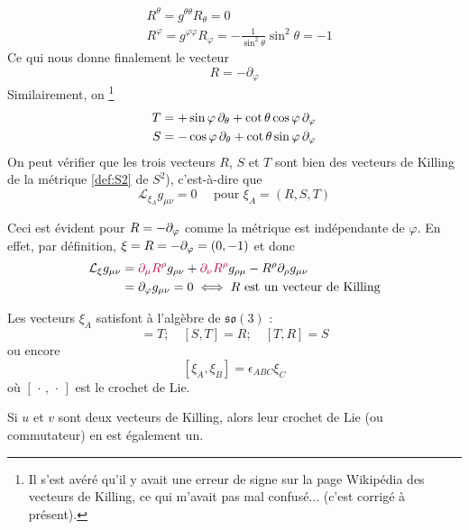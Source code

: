 \begin{align}
    &R^{\theta} = g^{\theta \theta}R_{\theta} = 0\\
    &R^{\varphi} = g^{\varphi \varphi}R_{\varphi} = -\frac{1}{\sin^2{\theta}}\sin^2{\theta} = -1
\end{align}
Ce qui nous donne finalement le vecteur
\begin{equation}
    R = -\partial_{\varphi}
\end{equation}
Similairement, on \footnote{Il s'est avéré qu'il y avait une erreur de signe sur la page Wikipédia des vecteurs de Killing, ce qui m'avait pas mal confusé... (c'est corrigé à présent).}
\begin{align}
    T &= + \sin \varphi \, \partial_\theta + \cot \theta \cos \varphi \, \partial_\varphi\\
    S &= - \cos \varphi \, \partial_\theta +\cot \theta \sin \varphi \, \partial_\varphi 
\end{align}
On peut vérifier que les trois vecteurs $R$, $S$ et $T$ sont bien des vecteurs de Killing de la métrique \ref{def:S2} de $S^2$), c'est-à-dire que 
\begin{equation}
    \label{eq:sym sphérique killing}
    \mathcal{L}_{\xi_A}g_{\mu \nu} = 0 \quad\text{ pour } \xi_A = (R, S, T)
\end{equation}
\begin{rmk}
    Ceci est évident pour $R = - \partial_\varphi$ comme la métrique est indépendante de $\varphi$. En effet, par définition, $\xi = R = -\partial_\varphi = (0,-1)$ et donc
    \begin{align}
        \mathcal{L}_{\xi}g_{\mu \nu} & = \textcolor{purple}{\partial_\mu R^\rho} g_{\rho \nu} +\textcolor{purple}{\partial_\nu R^\rho} g_{\rho \mu} - R^\rho \partial_\rho g_{\mu\nu} \\ 
        &= \partial_\varphi g_{\mu\nu} = 0 \iff \text{$R$ est un vecteur de Killing}
    \end{align}
\end{rmk}
Les vecteurs $\xi_A$ satisfont à l'algèbre de $\mathfrak{so}(3)$ :
\begin{equation}
    [R,S]  = T ; \quad [S,T]  = R ; \quad [T,R]  = S
\end{equation}
ou encore 
\begin{equation}
    \label{eq:algèbre de so(3)}
    [\xi_A,\xi_B] = \epsilon_{ABC} \xi_C
\end{equation}
où $[\, \cdot \, , \, \cdot \, ]$ est le crochet de Lie.
\begin{rmk}
    Si $u$ et $v$ sont deux vecteurs de Killing, alors leur crochet de Lie (ou commutateur) en est également un.
\end{rmk}
